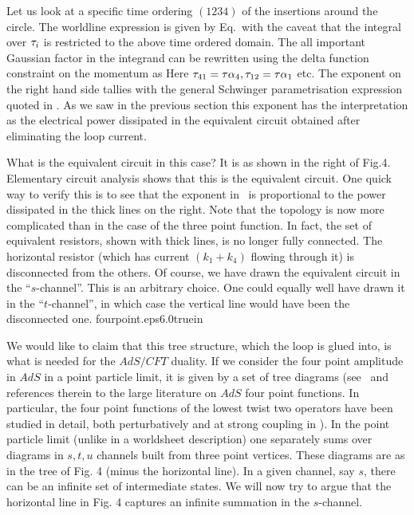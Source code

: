 Let us look at a specific time ordering $(1234)$ of the insertions around the circle. The 
worldline expression is given by Eq.\wlint\ with the caveat that the integral over ${\tau}_i$
is restricted to the above time ordered domain. The all important Gaussian factor 
in the integrand can be rewritten using the delta function constraint on the momentum as  
\eqn{}
Here ${\tau}_{41}={\tau}{\alpha}_4,{\tau}_{12}={\tau}{\alpha}_1$ etc. The exponent on the right hand side
tallies with the general Schwinger 
parametrisation expression quoted in \power . As we saw in the previous section this exponent
has the interpretation as the electrical power dissipated in the equivalent circuit obtained 
after eliminating the loop current. 

What is the equivalent circuit in this case? It is as shown in the right of Fig.4. Elementary circuit analysis 
shows that this is the equivalent circuit. One quick way to verify this is to 
see that the exponent in \gaussfour\ is proportional to 
the power dissipated in the thick lines on the right.
Note that the topology is now more complicated than in the case of the three point function. 
In fact, the set of equivalent resistors, shown with thick lines, is no longer fully connected.
The horizontal resistor (which has current $(k_1+k_4)$ flowing through it) is disconnected 
from the 
others. Of course, we have drawn the  equivalent circuit in the ``$s$-channel''. This is an 
arbitrary choice. One could equally
well have drawn it in the ``$t$-channel'', in which case the vertical line would have been 
the disconnected one. 
%
{fourpoint.eps}{6.0truein}
%

We would like to claim that
this tree structure, which the loop is glued into, is what is needed for the $AdS/CFT$
duality. If we consider the four point amplitude in $AdS$ in a point particle limit, 
it is given by a set of tree 
diagrams (see \dfmmr\ and references therein to the large literature
on $AdS$ four point functions. In particular, the four point functions of the lowest twist
two operators have been studied in detail, both perturbatively and at strong coupling in 
\glebfrpet ). 
In the point particle limit (unlike in a worldsheet description) one 
separately sums over diagrams in $s,t,u$ channels built from three point vertices.
These diagrams are as in the tree of Fig. 4 (minus the horizontal line). 
In a given channel, say $s$, there can be an infinite set of intermediate states. We 
will now try to argue that the horizontal line in Fig. 4 captures an infinite summation in the
$s$-channel. 

